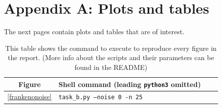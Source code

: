 \documentclass[onecolumn,10pt,cleanfoot]{asme2ej}
\begin{document}
\section*{Appendix A: Plots and tables}

The next pages contain plots and tables that are of interest.

\begin{table}
\caption{This table shows the command to execute to reproduce every figure in the report. (More info about the scripts and their parameters can be found in the README)}
\begin{center}
\label{allparamstable}
\begin{tabular}{c | l l l}
Figure & Shell command (leading \texttt{python3} omitted) \\
\hline
\ref{frankenonoise} & \texttt{task\_b.py --noise 0 -n 25}\\
\hline
\end{tabular}
\end{center}
\end{table}
\end{document}
